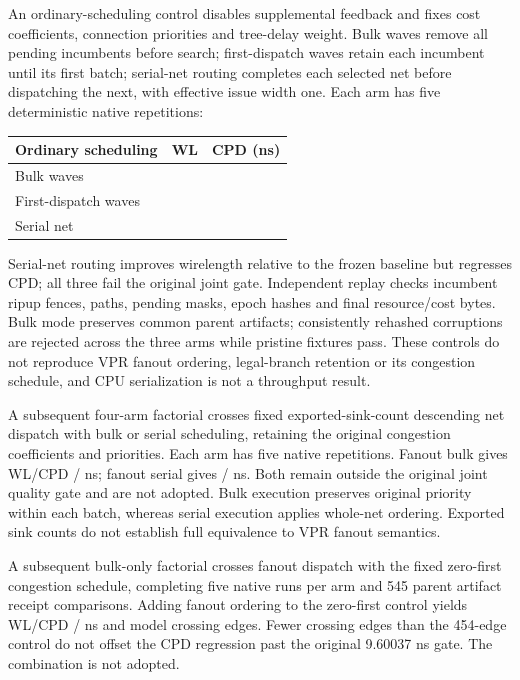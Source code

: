 \documentclass[10pt]{article}
\begin{document}
An ordinary-scheduling control disables supplemental feedback and fixes
cost coefficients, connection priorities and tree-delay weight. Bulk waves
remove all pending incumbents before search; first-dispatch waves retain
each incumbent until its first batch; serial-net routing completes each
selected net before dispatching the next, with effective issue width one.
Each arm has five deterministic native repetitions:
\begin{center}
\begin{tabular}{lrr}\toprule
Ordinary scheduling & WL & CPD (ns) \\
\midrule
Bulk waves & \OrdinaryBulkWL{} & \OrdinaryBulkCPD{} \\
First-dispatch waves & \OrdinaryDispatchWL{} & \OrdinaryDispatchCPD{} \\
Serial net & \OrdinarySerialWL{} & \OrdinarySerialCPD{} \\
\bottomrule
\end{tabular}
\end{center}
Serial-net routing improves wirelength relative to the frozen baseline but
regresses CPD; all three fail the original joint gate. Independent replay
checks incumbent ripup fences, paths, pending masks, epoch hashes and final
resource/cost bytes. Bulk mode preserves \OrdinaryCompatible{} common
parent artifacts; \OrdinaryCorruptions{} consistently rehashed corruptions
are rejected across the three arms while pristine fixtures pass. These
controls do not reproduce VPR fanout ordering, legal-branch retention or
its congestion schedule, and CPU serialization is not a throughput result.

A subsequent four-arm factorial crosses fixed exported-sink-count descending
net dispatch with bulk or serial scheduling, retaining the original
congestion coefficients and priorities. Each arm has five native repetitions.
Fanout bulk gives WL/CPD \FanoutBulkWL{}/\FanoutBulkCPD{} ns;
fanout serial gives \FanoutSerialWL{}/\FanoutSerialCPD{} ns.
Both remain outside the original joint quality gate and are not adopted.
Bulk execution preserves original priority within each batch, whereas serial
execution applies whole-net ordering. Exported sink counts do not establish
full equivalence to VPR fanout semantics.

A subsequent bulk-only factorial crosses fanout dispatch with the fixed
zero-first congestion schedule, completing five native runs per arm and
545 parent artifact receipt comparisons. Adding fanout ordering to the
zero-first control yields WL/CPD \WarmFanoutWL{}/\WarmFanoutCPD{} ns
and \WarmFanoutCrossings{} model crossing edges. Fewer crossing edges
than the 454-edge control do not offset the CPD regression past the
original 9.60037 ns gate. The combination is not adopted.
\end{document}
